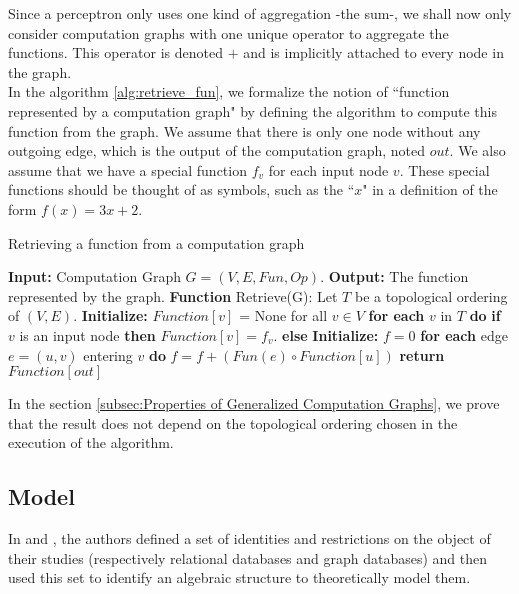 \documentclass[11pt,a4paper]{article}
\theoremstyle{definition}
\begin{document}
	Since a perceptron only uses one kind of aggregation -the sum-, we shall now only consider computation graphs with one unique operator to aggregate the functions. This operator is denoted $+$ and is implicitly attached to every node in the graph.\\

In the algorithm \ref{alg:retrieve_fun}, we formalize the notion of ``function represented by a computation graph" by defining the algorithm to compute this function from the graph. We assume that there is only one node without any outgoing edge, which is the output of the computation graph, noted $out$. We also assume that we have a special function $f_v$ for each input node $v$. These special functions should be thought of as symbols, such as the ``$x$" in a definition of the form $f(x)=3x+2$.


\begin{algorithm}
\caption{Retrieving a function from a computation graph}
\label{alg:retrieve_fun}
\begin{algorithmic}[1]
\STATE \textbf{Input:} Computation Graph $G = (V, E, Fun, Op)$.
\STATE \textbf{Output:} The function represented by the graph.
\STATE
\STATE \textbf{Function} Retrieve(G):
\STATE \quad Let $T$ be a topological ordering of $(V,E)$.
\STATE \quad \textbf{Initialize:} $Function[v]$ = None for all $v \in V$
\STATE \quad \textbf{for each} $v$ in $T$ \textbf{do}
\STATE \quad \quad \textbf{if} $v$ is an input node \textbf{then}
\STATE \quad \quad \quad $Function[v]=f_v$.
\STATE \quad \quad \textbf{else}
\STATE \quad \quad \quad \textbf{Initialize:} $f=0$
\STATE \quad \quad \quad \textbf{for each} edge $e=(u,v)$ entering $v$ \textbf{do}
\STATE \quad \quad \quad \quad $f=f + (Fun(e) \circ Function[u])$
\STATE \quad \textbf{return} $Function[out]$
\end{algorithmic}
\end{algorithm}

	In the section \ref{subsec:Properties of Generalized Computation Graphs}, we prove that the result does not depend on the topological ordering chosen in the execution of the algorithm.

\subsection{Model}

	In  and , the authors defined a set of identities and restrictions on the object of their studies (respectively relational databases and graph databases) and then used this set to identify an algebraic structure to theoretically model them.
	
\end{document}
